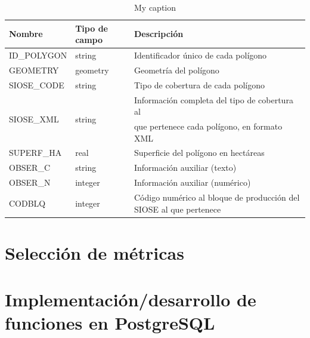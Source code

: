 \begin{table}[]
\centering
\caption{My caption}
\label{my-label}
\begin{tabular}{@{}lll@{}}
\toprule
\textbf{Nombre}             & \textbf{Tipo de campo}  & \textbf{Descripción}                                               \\ \midrule
ID\_POLYGON                 & string                  & Identificador único de cada polígono                               \\
GEOMETRY                    & geometry                & Geometría del polígono                                             \\
SIOSE\_CODE                 & string                  & Tipo de cobertura de cada polígono                                 \\
\multirow{2}{*}{SIOSE\_XML} & \multirow{2}{*}{string} & Información completa del tipo de cobertura al                      \\
                            &                         & que pertenece cada polígono, en formato XML                        \\
SUPERF\_HA                  & real                    & Superficie del polígono en hectáreas                               \\
OBSER\_C                    & string                  & Información auxiliar (texto)                                       \\
OBSER\_N                    & integer                 & Información auxiliar (numérico)                                    \\
CODBLQ                      & integer                 & Código numérico al bloque de producción del SIOSE al que pertenece \\ \bottomrule
\end{tabular}
\end{table}




\section{Selección de métricas}

\section{Implementación/desarrollo de funciones en PostgreSQL}

